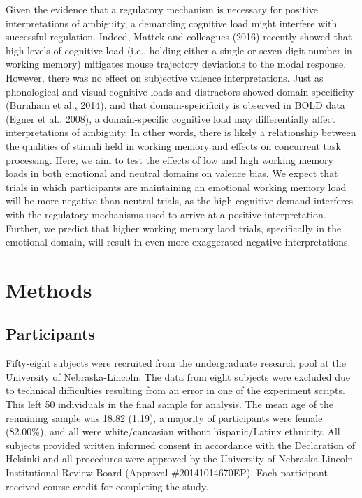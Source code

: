 \documentclass[man]{apa6}
\begin{document}
Given the evidence that a regulatory mechanism is necessary for positive interpretations of ambiguity, a demanding cognitive load might interfere with successful regulation. Indeed, Mattek and colleagues (2016) recently showed that high levels of cognitive load (i.e., holding either a single or seven digit number in working memory) mitigates mouse trajectory deviations to the modal response. However, there was no effect on subjective valence interpretations. Just as phonological and visual cognitive loads and distractors showed domain-specificity (Burnham et al., 2014), and that domain-speicificity is observed in BOLD data (Egner et al., 2008), a domain-specific cognitive load may differentially affect interpretations of ambiguity. In other words, there is likely a relationship between the qualities of stimuli held in working memory and effects on concurrent task processing. Here, we aim to test the effects of low and high working memory loads in both emotional and neutral domains on valence bias. We expect that trials in which participants are maintaining an emotional working memory load will be more negative than neutral trials, as the high cognitive demand interferes with the regulatory mechanisms used to arrive at a positive interpretation. Further, we predict that higher working memory laod trials, specifically in the emotional domain, will result in even more exaggerated negative interpretations.

\hypertarget{methods}{%
\section{Methods}\label{methods}}

\hypertarget{participants}{%
\subsection{Participants}\label{participants}}

Fifty-eight subjects were recruited from the undergraduate research pool at the University of Nebraska-Lincoln. The data from eight subjects were excluded due to technical difficulties resulting from an error in one of the experiment scripts. This left 50 individuals in the final sample for analysis. The mean age of the remaining sample was 18.82 (1.19), a majority of participants were female (82.00\%), and all were white/caucasian without hispanic/Latinx ethnicity. All subjects provided written informed consent in accordance with the Declaration of Helsinki and all procedures were approved by the University of Nebraska-Lincoln Institutional Review Board (Approval \#20141014670EP). Each participant received course credit for completing the study.
\end{document}
